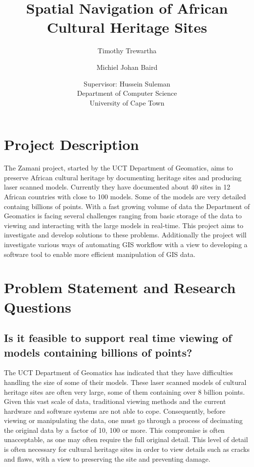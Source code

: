 \documentclass[12pt,a4paper]{article}
\begin{document}
\author{Timothy Trewartha \\
\and
Michiel Johan Baird \\
\and
Supervisor: Hussein Suleman \\
Department of Computer Science \\
University of Cape Town
 }
\title{Spatial Navigation of African Cultural Heritage Sites}
\maketitle

\section{Project Description}
The Zamani project, started by the UCT Department of Geomatics, aims to
preserve African cultural heritage by documenting heritage sites and producing
laser scanned models. Currently they have documented about 40 sites in 12 African
countries with close to 100 models. Some of the models are very detailed containg
billions of points. With a fast growing volume of data the Department of Geomatics
is facing several challenges ranging from basic storage of the data to viewing and
interacting with the large models in real-time. This project aims to investigate
and develop solutions to these problems. Additionally the project will investigate
various ways of automating GIS workflow with a view to developing a software tool
to enable more efficient manipulation of GIS data.

\section{Problem Statement and Research Questions}
\subsection{Is it feasible to support real time viewing of models containing billions of points?}
The UCT Department of Geomatics has indicated that they have difficulties
handling the size of some of their models. These laser scanned models of
cultural heritage sites are often very large, some of them containing over
8 billion points. Given this vast scale of data, traditional viewing methods
and the current hardware and software systems are not able to cope.
Consequently, before viewing or manipulating the data, one must go through
a process of decimating the original data by a factor of 10, 100 or more.
This compromise is often unacceptable, as one may often require the full
original detail. This level of detail is often necessary for cultural heritage
sites in order to view details such as cracks and flaws, with a view to
preserving the site and preventing damage.
\end{document}
